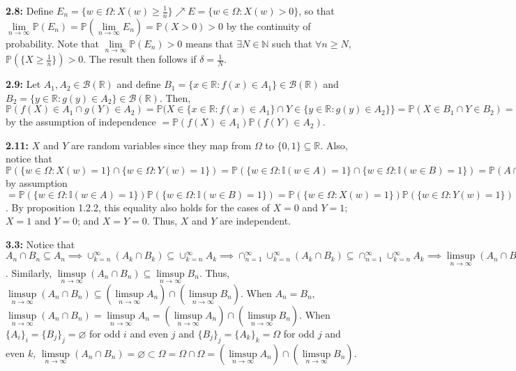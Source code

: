 \documentclass[12pt]{article}
\newcommand{\I}{\mathbb{I}}
\newcommand{\p}{\mathbb{P}}
\begin{document}
\textbf{2.8:} Define $E_n = \{w \in \Omega: X(w) \geq \frac{1}{n}\} \nearrow E = \{w \in \Omega: X(w) > 0\}$, so that $\lim \limits_{n \to \infty} \p(E_n) = \p(\lim \limits_{n \to \infty} E_n) = \p(X > 0) > 0$ by the continuity of probability. Note that $\lim \limits_{n \to \infty} \p(E_n) > 0$ means that $\exists N \in \mathbb{N}$ such that $\forall n \geq N$, $\p(\{X \geq \frac{1}{n}\}) > 0$. The result then follows if $\delta = \frac{1}{N}$.

\textbf{2.9:} Let $A_1, A_2 \in \mathcal{B}(\mathbb{R})$ and define $B_1 = \{x \in \mathbb{R}: f(x) \in A_1\} \in \mathcal{B}(\mathbb{R})$ and $B_2 = \{y \in \mathbb{R}: g(y) \in A_2\} \in \mathcal{B}(\mathbb{R})$. Then, $\p(f(X) \in A_1 \cap g(Y) \in A_2) = \p(X \in \{x \in \mathbb{R}: f(x) \in A_1\} \cap Y \in \{y \in \mathbb{R}: g(y) \in A_2\}\} = \p(X \in B_1 \cap Y \in B_2) = \p(X \in B_1)\p(Y \in B_2)$ by the assumption of independence $= \p(f(X) \in A_1)\p(f(Y) \in A_2)$.

\textbf{2.11:} $X$ and $Y$ are random variables since they map from $\Omega$ to $\{0, 1\} \subseteq \mathbb{R}$. Also, notice that $\p(\{w \in \Omega: X(w) = 1\} \cap \{w \in \Omega: Y(w) = 1\}) = \p(\{w \in \Omega: \I(w \in A) = 1\} \cap \{w \in \Omega: \I(w \in B) = 1\}) = \p(A \cap B) = \p(A)\p(B)$ by assumption $= \p(\{w \in \Omega: \I(w \in A) = 1\})\p(\{w \in \Omega: \I(w \in B) = 1\}) = \p(\{w \in \Omega: X(w) = 1\})\p(\{w \in \Omega: Y(w) = 1\})$. By proposition 1.2.2, this equality also holds for the cases of $X = 0$ and $Y = 1$; $X = 1$ and $Y = 0$; and $X = Y = 0$. Thus, $X$ and $Y$ are independent.

\textbf{3.3:} Notice that $A_n \cap B_n \subseteq A_n \implies \cup_{k=n}^\infty (A_k \cap B_k) \subseteq \cup_{k=n}^\infty A_k \implies \cap_{n=1}^\infty \cup_{k=n}^\infty (A_k \cap B_k) \subseteq \cap_{n=1}^\infty \cup_{k=n}^\infty A_k \implies \limsup \limits_{n \to \infty} (A_n \cap B_n) \subseteq \limsup \limits_{n \to \infty} A_n$. Similarly, $\limsup \limits_{n \to \infty} (A_n \cap B_n) \subseteq \limsup \limits_{n \to \infty} B_n$. Thus, $\limsup \limits_{n \to \infty} (A_n \cap B_n) \subseteq (\limsup \limits_{n \to \infty} A_n) \cap (\limsup \limits_{n \to \infty} B_n)$. When $A_n = B_n$, $\limsup \limits_{n \to \infty} (A_n \cap B_n) = \limsup \limits_{n \to \infty} A_n = (\limsup \limits_{n \to \infty} A_n) \cap (\limsup \limits_{n \to \infty} B_n)$. When $\{A_i\}_i = \{B_j\}_j = \varnothing$ for odd $i$ and even $j$ and $\{B_j\}_j = \{A_k\}_k = \Omega$ for odd $j$ and even $k$, $\limsup \limits_{n \to \infty} (A_n \cap B_n) = \varnothing \subset \Omega = \Omega \cap \Omega = (\limsup \limits_{n \to \infty} A_n) \cap (\limsup \limits_{n \to \infty} B_n)$.
\end{document}
